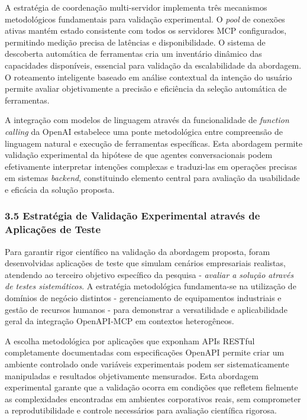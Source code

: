 \documentclass[
]{article}
\begin{document}
A estratégia de coordenação multi-servidor implementa três mecanismos
metodológicos fundamentais para validação experimental. O \emph{pool} de
conexões ativas mantém estado consistente com todos os servidores MCP
configurados, permitindo medição precisa de latências e disponibilidade.
O sistema de descoberta automática de ferramentas cria um inventário
dinâmico das capacidades disponíveis, essencial para validação da
escalabilidade da abordagem. O roteamento inteligente baseado em análise
contextual da intenção do usuário permite avaliar objetivamente a
precisão e eficiência da seleção automática de ferramentas.

A integração com modelos de linguagem através da funcionalidade de
\emph{function calling} da OpenAI estabelece uma ponte metodológica
entre compreensão de linguagem natural e execução de ferramentas
específicas. Esta abordagem permite validação experimental da hipótese
de que agentes conversacionais podem efetivamente interpretar intenções
complexas e traduzi-las em operações precisas em sistemas
\emph{backend}, constituindo elemento central para avaliação da
usabilidade e eficácia da solução proposta.

\subsubsection{3.5 Estratégia de Validação Experimental através de
Aplicações de
Teste}\label{estratuxe9gia-de-validauxe7uxe3o-experimental-atravuxe9s-de-aplicauxe7uxf5es-de-teste}

Para garantir rigor científico na validação da abordagem proposta, foram
desenvolvidas aplicações de teste que simulam cenários empresariais
realistas, atendendo ao terceiro objetivo específico da pesquisa -
\emph{avaliar a solução através de testes sistemáticos}. A estratégia
metodológica fundamenta-se na utilização de domínios de negócio
distintos - gerenciamento de equipamentos industriais e gestão de
recursos humanos - para demonstrar a versatilidade e aplicabilidade
geral da integração OpenAPI-MCP em contextos heterogêneos.

A escolha metodológica por aplicações que exponham APIs RESTful
completamente documentadas com especificações OpenAPI permite criar um
ambiente controlado onde variáveis experimentais podem ser
sistematicamente manipuladas e resultados objetivamente mensurados. Esta
abordagem experimental garante que a validação ocorra em condições que
refletem fielmente as complexidades encontradas em ambientes
corporativos reais, sem comprometer a reprodutibilidade e controle
necessários para avaliação científica rigorosa.
\end{document}

